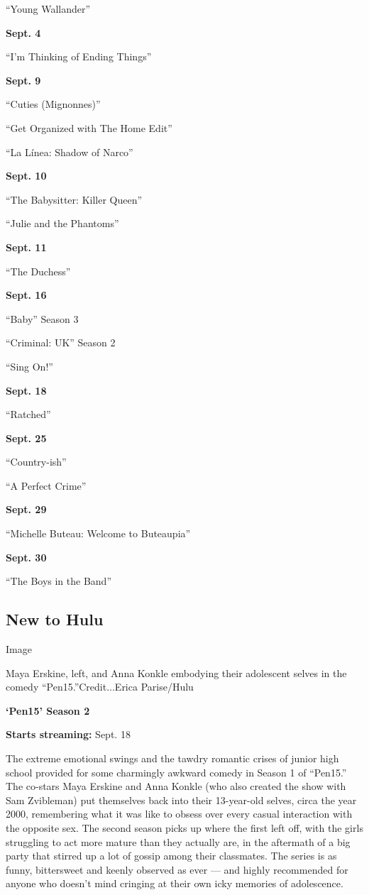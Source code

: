 ``Young Wallander''

\textbf{Sept. 4}

``I'm Thinking of Ending Things''

\textbf{Sept. 9}

``Cuties (Mignonnes)''

``Get Organized with The Home Edit''

``La Línea: Shadow of Narco''

\textbf{Sept. 10}

``The Babysitter: Killer Queen''

``Julie and the Phantoms''

\textbf{Sept. 11}

``The Duchess''

\textbf{Sept. 16}

``Baby'' Season 3

``Criminal: UK'' Season 2

``Sing On!''

\textbf{Sept. 18}

``Ratched''

\textbf{Sept. 25}

``Country-ish''

``A Perfect Crime''

\textbf{Sept. 29}

``Michelle Buteau: Welcome to Buteaupia''

\textbf{Sept. 30}

``The Boys in the Band''

\hypertarget{new-to-hulu}{%
\subsection{New to Hulu}\label{new-to-hulu}}

Image

Maya Erskine, left, and Anna Konkle embodying their adolescent selves in
the comedy ``Pen15.''Credit...Erica Parise/Hulu

\textbf{`Pen15' Season 2}

\textbf{Starts streaming:} Sept. 18

The extreme emotional swings and the tawdry romantic crises of junior
high school provided for some charmingly awkward comedy in Season 1 of
``Pen15.'' The co-stars Maya Erskine and Anna Konkle (who also created
the show with Sam Zvibleman) put themselves back into their 13-year-old
selves, circa the year 2000, remembering what it was like to obsess over
every casual interaction with the opposite sex. The second season picks
up where the first left off, with the girls struggling to act more
mature than they actually are, in the aftermath of a big party that
stirred up a lot of gossip among their classmates. The series is as
funny, bittersweet and keenly observed as ever --- and highly
recommended for anyone who doesn't mind cringing at their own icky
memories of adolescence.


